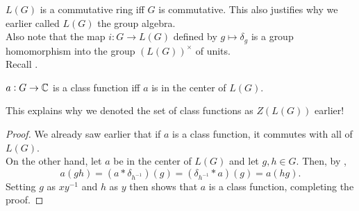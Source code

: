 		$L(G)$ is a commutative ring iff $G$ is commutative. This also justifies why we earlier called $L(G)$ the group algebra.\\
		Also note that the map $i : G \to L(G)$ defined by $g \mapsto \delta_g$ is a group homomorphism into the group $(L(G))^\times$ of units.\\
		Recall .

		\begin{fprop}
			$a : G \to \mathbb{C}$ is a class function iff $a$ is in the center of $L(G)$.
		\end{fprop}
		This explains why we denoted the set of class functions as $Z(L(G))$ earlier!
		\begin{proof}
			We already saw earlier that if $a$ is a class function, it commutes with all of $L(G)$.\\
			On the other hand, let $a$ be in the center of $L(G)$ and let $g,h \in G$. Then, by ,
			\[ a(gh) = (a * \delta_{h^{-1}})(g) = (\delta_{h^{-1}} * a) (g) = a(hg). \]
			Setting $g$ as $xy^{-1}$ and $h$ as $y$ then shows that $a$ is a class function, completing the proof.
		\end{proof}
